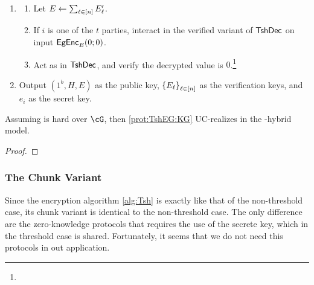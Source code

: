 \begin{protocol}
\begin{enumerate}
\begin{enumerate}
			\item Output $c_i = a_i b_i  + \sum_{\ell \in  \nminusi} c_{i,\ell} + c_{i,\ell}'$.
			
			\item Let $c \asn \sum_{\ell \in c_i}$.
			 
			
			
			
			
			
			\item Send $E'_i \asn b_i \cdot c^{-1} \cdot H$ to all parties.
			
			
		\end{enumerate}
		
		\item {}
		
		\begin{enumerate}
			\item 	Let $E \leftarrow \sum_{\ell \in [n]} E'_\ell$.
			
			\item If $i$ is one  of the  $t$ parties, interact in the verified variant of  $\mathsf{TshDec}$ on input $\mathsf{EgEnc}_E(0;0)$.
			
			\item Act as \Cc in $\mathsf{TshDec}$,  and verify the  decrypted value is $0$.\footnote{}
		\end{enumerate}
	
		
		\item Output $(1^b,H,E)$ as the public key, $\set{E_\ell}_{\ell \in [n]}$ as the verification keys, and $e_i$ as the secret key.
			
		\end{enumerate}
	
	
\end{protocol}


\begin{theorem}\label{thm:TshEG:KG}
	Assuming \DDH is hard over $\cG$, then \cref{prot:TshEG:KG} UC-realizes \tdKg in the \sset{\randomH,{\Mult}}-hybrid model.
\end{theorem}
\begin{proof}
\end{proof}


\subsubsection{The Chunk Variant}\label{sec:ChanksEg:TshEG:Chunk}	
Since the encryption algorithm  \cref{alg:Tsh} is exactly like that of the non-threshold case, its chunk variant is identical to the non-threshold case. The only difference are the zero-knowledge protocols  that requires the use of the secrete key, which in the threshold case is shared. Fortunately, it seems that  we do not need this protocols in out application.


